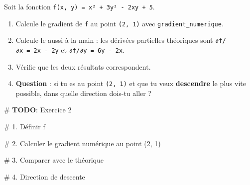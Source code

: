 \documentclass[
  french,
  11pt,
  a4paper,
]{scrbook}
\newenvironment{Shaded}{}{}
\newcommand{\AlertTok}[1]{\textcolor[rgb]{1.00,0.33,0.33}{\textbf{#1}}}
\newcommand{\CommentTok}[1]{\textcolor[rgb]{0.42,0.45,0.49}{#1}}
\providecommand{\tightlist}{%
  \setlength{\itemsep}{0pt}\setlength{\parskip}{0pt}}
\begin{document}
\begin{tcolorbox}[enhanced jigsaw, arc=.35mm, bottomrule=.15mm, bottomtitle=1mm, breakable, colback=white, colbacktitle=quarto-callout-note-color!10!white, colframe=quarto-callout-note-color-frame, coltitle=black, left=2mm, leftrule=.75mm, opacityback=0, opacitybacktitle=0.6, rightrule=.15mm, title={📝 Énoncé}, titlerule=0mm, toprule=.15mm, toptitle=1mm]

Soit la fonction \texttt{f(x,\ y)\ =\ x²\ +\ 3y²\ -\ 2xy\ +\ 5}.

\begin{enumerate}
\def\labelenumi{\arabic{enumi}.}
\tightlist
\item
  Calcule le gradient de \texttt{f} au point \texttt{(2,\ 1)} avec
  \texttt{gradient\_numerique}.
\item
  Calcule-le aussi à la main : les dérivées partielles théoriques sont
  \texttt{∂f/∂x\ =\ 2x\ -\ 2y} et \texttt{∂f/∂y\ =\ 6y\ -\ 2x}.
\item
  Vérifie que les deux résultats correspondent.
\item
  \textbf{Question} : si tu es au point \texttt{(2,\ 1)} et que tu veux
  \textbf{descendre} le plus vite possible, dans quelle direction
  dois-tu aller ?
\end{enumerate}

\end{tcolorbox}

\begin{Shaded}
\begin{Highlighting}[]
\CommentTok{\# }\AlertTok{TODO}\CommentTok{: Exercice 2}

\CommentTok{\# 1. Définir f}


\CommentTok{\# 2. Calculer le gradient numérique au point (2, 1)}


\CommentTok{\# 3. Comparer avec le théorique}


\CommentTok{\# 4. Direction de descente}
\end{Highlighting}
\end{Shaded}
\end{document}
